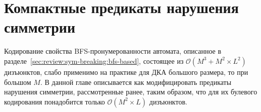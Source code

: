 
\chapter{Компактные предикаты нарушения симметрии} 
\label{sec:tight}


Кодирование свойства BFS-пронумерованности автомата, описанное в разделе~\ref{sec:review:sym-breaking:bfs-based}, состоящее из $\mathcal{O}\left(M^{3} + M^{2} \times L^{2}\right)$ дизъюнктов, слабо применимо на практике для ДКА большого размера, то при большом $M$. В данной главе описывается как модифицировать предикаты нарушения симметрии, рассмотренные ранее, таким образом, что для их булевого кодирования понадобится только $\mathcal{O}\left(M^{2} \times L\right)$ дизъюнктов.

